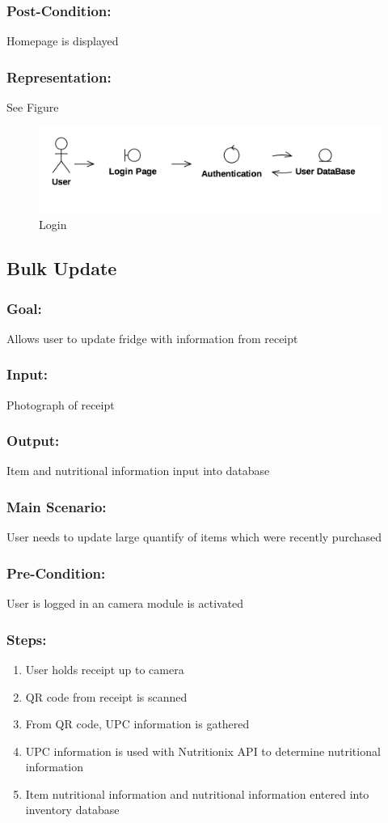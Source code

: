 		\subsubsection{Post-Condition:} Homepage is displayed
		\subsubsection{Representation:} See Figure~\thesubsection
		\begin{figure}[p]
			\centering
			\includegraphics[width=\textwidth]{login.png}
			\caption{Login}
		\end{figure}
		
	\subsection{Bulk Update}
	
		\subsubsection{Goal:} Allows user to update fridge with information from receipt
		\subsubsection{Input:} Photograph of receipt
		\subsubsection{Output:} Item and nutritional information input into database
		\subsubsection{Main Scenario:} User needs to update large quantify of items which were recently purchased
		\subsubsection{Pre-Condition:} User is logged in an camera module is activated
		\subsubsection{Steps:} 
		\begin{enumerate}
			\item User holds receipt up to camera
			\item QR code from receipt is scanned
			\item From QR code, UPC information is gathered
			\item UPC information is used with Nutritionix API to determine nutritional information
			\item Item nutritional information and nutritional information entered into inventory database
		\end{enumerate}
